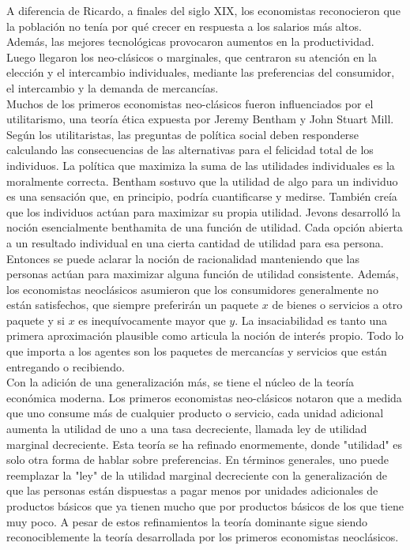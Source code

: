 A diferencia de Ricardo, a finales del siglo XIX, los economistas reconocieron que la población no tenía por qué crecer en respuesta a los salarios más altos. Además, las mejores tecnológicas provocaron aumentos en la productividad. Luego llegaron los neo-clásicos o marginales, que centraron su atención en la elección y el intercambio individuales, mediante las preferencias del consumidor, el intercambio y la demanda de mercancías.\\


Muchos de los primeros economistas neo-clásicos fueron influenciados por el utilitarismo, una teoría ética expuesta por Jeremy Bentham y John Stuart Mill. Según los utilitaristas, las preguntas de política social deben responderse calculando las consecuencias de las alternativas para el felicidad total de los individuos. La política que maximiza la suma de las utilidades individuales es la moralmente correcta. Bentham sostuvo que la utilidad de algo para un individuo es una sensación que, en principio, podría cuantificarse y medirse. También creía que los individuos actúan para maximizar su propia utilidad. Jevons desarrolló la noción esencialmente benthamita de una función de utilidad. Cada opción abierta a un resultado individual en una cierta cantidad de utilidad para esa persona. Entonces se puede aclarar la noción de racionalidad manteniendo que las personas actúan para maximizar alguna función de utilidad consistente. Además, los economistas neoclásicos asumieron que los consumidores generalmente no están satisfechos, que siempre preferirán un paquete $x$ de bienes o servicios a otro paquete y si $x$ es inequívocamente mayor que $y$. La insaciabilidad es tanto una primera aproximación plausible como articula la noción de interés propio. Todo lo que importa a los agentes son los paquetes de mercancías y servicios que están entregando o recibiendo. \\

Con la adición de una generalización más, se tiene el núcleo de la teoría económica moderna. Los primeros economistas neo-clásicos notaron que a medida que uno consume más de cualquier producto o servicio, cada unidad adicional aumenta la utilidad de uno a una tasa decreciente, llamada ley de utilidad marginal decreciente. Esta teoría se ha refinado enormemente, donde "utilidad" es solo otra forma de hablar sobre preferencias. En términos generales, uno puede reemplazar la "ley" de la utilidad marginal decreciente con la generalización de que las personas están dispuestas a pagar menos por unidades adicionales de productos básicos que ya tienen mucho que por productos básicos de los que tiene muy poco. A pesar de estos refinamientos la teoría dominante sigue siendo reconociblemente la teoría desarrollada por los primeros economistas neoclásicos.\\


